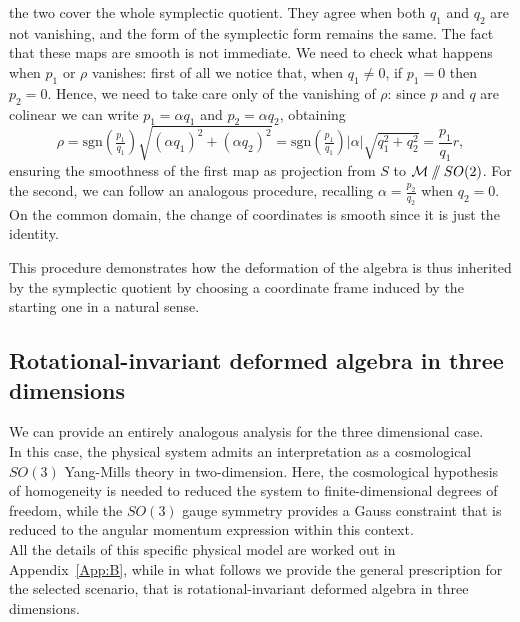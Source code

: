 \documentclass{article}
\numberwithin{equation}{section}
\theoremstyle{definition}
\newcommand{\M}{\mathcal{M}}
\newcommand{\sslash}{\mathbin{/\mkern-6mu/}}
\begin{document}
the two cover the whole symplectic quotient. They agree when both $q_1$ and $q_2$ are not vanishing, and the form of the symplectic form remains the same. The fact that these maps are smooth is not immediate. We need to check what happens when $p_1$ or $\rho$ vanishes: first of all we notice that, when $q_1\neq 0$, if $p_1=0$ then $p_2=0$. Hence, we need to take care only of the vanishing of $\rho$: since $p$ and $q$ are colinear we can write $p_1=\alpha q_1$ and $p_2=\alpha q_2$, obtaining
\[\rho=\mathrm{sgn}\left(\tfrac{p_1}{q_1}\right)\sqrt{(\alpha q_1)^2+(\alpha q_2)^2}=\mathrm{sgn}\left(\tfrac{p_1}{q_1}\right)|\alpha|\sqrt{q_1^2+q_2^2}=\frac{p_1}{q_1}r,\]
ensuring the smoothness of the first map as projection from $S$ to $\M\sslash SO(2)$. For the second, we can follow an analogous procedure, recalling $\alpha=\frac{p_2}{q_2}$ when $q_2=0$. On the common domain, the change of coordinates is smooth since it is just the identity.

\bigskip

This procedure demonstrates how the deformation of the algebra is thus inherited by the symplectic quotient by choosing a coordinate frame induced by the starting one in a natural sense.

\subsection{Rotational-invariant deformed algebra in three dimensions}
\label{Sec:3-d}
We can provide an entirely analogous analysis for the three dimensional case. \\
In this case, the physical system admits an interpretation as a cosmological $SO(3)$ Yang-Mills theory in two-dimension. Here, the cosmological hypothesis of homogeneity is needed to reduced the system to finite-dimensional degrees of freedom, while the $SO(3)$ gauge symmetry provides a Gauss constraint that is reduced to the angular momentum expression within this context. \\
All the details of this specific physical model are worked out in Appendix~\ref{App:B}, while in what follows we provide the general prescription for the selected scenario, that is rotational-invariant deformed algebra in three dimensions. \\
\end{document}
